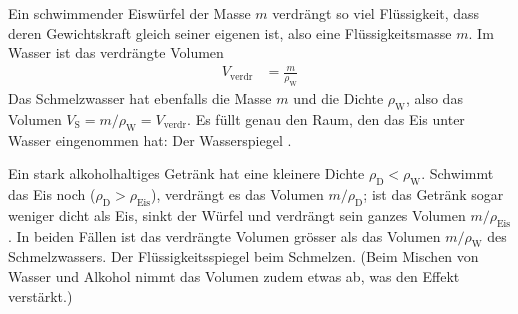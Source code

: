 Ein schwimmender Eiswürfel der Masse $m$ verdrängt so viel Flüssigkeit, dass deren Gewichtskraft gleich seiner eigenen ist, also eine Flüssigkeitsmasse $m$. Im Wasser ist das verdrängte Volumen
\begin{align}
 V_\text{verdr} &= \frac{m}{\rho_\text{W}}
\end{align}
Das Schmelzwasser hat ebenfalls die Masse $m$ und die Dichte $\rho_\text{W}$, also das Volumen $V_\text{S} = m/\rho_\text{W} = V_\text{verdr}$. Es füllt genau den Raum, den das Eis unter Wasser eingenommen hat: Der Wasserspiegel .

Ein stark alkoholhaltiges Getränk hat eine kleinere Dichte $\rho_\text{D} < \rho_\text{W}$. Schwimmt das Eis noch ($\rho_\text{D} > \rho_\text{Eis}$), verdrängt es das Volumen $m/\rho_\text{D}$; ist das Getränk sogar weniger dicht als Eis, sinkt der Würfel und verdrängt sein ganzes Volumen $m/\rho_\text{Eis}$. In beiden Fällen ist das verdrängte Volumen grösser als das Volumen $m/\rho_\text{W}$ des Schmelzwassers. Der Flüssigkeitsspiegel  beim Schmelzen. (Beim Mischen von Wasser und Alkohol nimmt das Volumen zudem etwas ab, was den Effekt verstärkt.)
